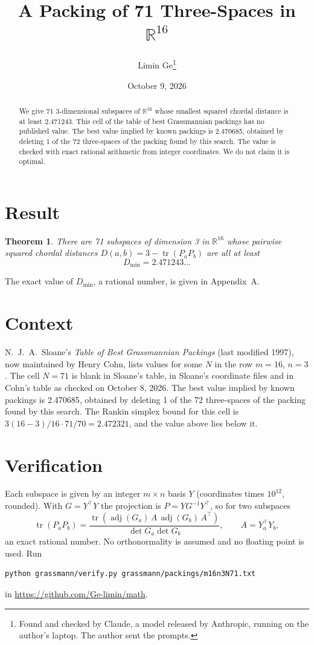 \documentclass[11pt,a4paper]{article}
\title{A Packing of 71 Three-Spaces in $\mathbb{R}^{16}$}
\author{Limin Ge\thanks{Found and checked by Claude, a model released by Anthropic, running on the author's laptop. The author sent the prompts.}}
\date{October 9, 2026}
\newtheorem*{theorem}{Theorem}
\begin{document}
\maketitle
\begin{abstract}
We give 71 3-dimensional subspaces of $\mathbb{R}^{16}$ whose smallest squared chordal distance is at least 2.471243. This cell of the table of best Grassmannian packings has no published value. The best value implied by known packings is 2.470685, obtained by deleting 1 of the 72 three-spaces of the packing found by this search. The value is checked with exact rational arithmetic from integer coordinates. We do not claim it is optimal.
\end{abstract}

\section{Result}
\begin{theorem}
There are 71 subspaces of dimension 3 in $\mathbb{R}^{16}$ whose pairwise squared chordal distances $D(a,b) = 3 - \operatorname{tr}(P_aP_b)$ are all at least
\[ D_{\min} = 2.471243\ldots \]
\end{theorem}
The exact value of $D_{\min}$, a rational number, is given in Appendix~A.


\section{Context}
N.~J.~A.~Sloane's \emph{Table of Best Grassmannian Packings} (last modified 1997), now maintained by Henry Cohn, lists values for some $N$ in the row $m=16$, $n=3$. The cell $N=71$ is blank in Sloane's table, in Sloane's coordinate files and in Cohn's table as checked on October 8, 2026. The best value implied by known packings is 2.470685, obtained by deleting 1 of the 72 three-spaces of the packing found by this search. The Rankin simplex bound for this cell is $3(16-3)/16\cdot 71/70 = 2.472321$, and the value above lies below it.


\section{Verification}
Each subspace is given by an integer $m\times n$ basis $Y$ (coordinates times $10^{12}$, rounded). With $G=Y^\top Y$ the projection is $P=YG^{-1}Y^\top$, so for two subspaces
\[ \operatorname{tr}(P_aP_b)=\frac{\operatorname{tr}(\operatorname{adj}(G_a)\,A\,\operatorname{adj}(G_b)\,A^\top)}{\det G_a\det G_b},\qquad A=Y_a^\top Y_b, \]
an exact rational number. No orthonormality is assumed and no floating point is used. Run
\begin{verbatim}
python grassmann/verify.py grassmann/packings/m16n3N71.txt
\end{verbatim}
in \url{https://github.com/Ge-limin/math}.
\end{document}
